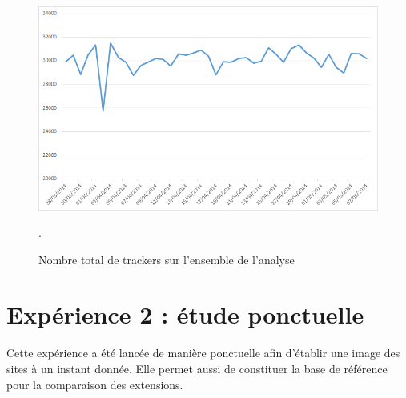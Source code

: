 \begin{figure}[h]
	\centering
	\includegraphics[scale=.8]{graphiques/Exp1_parser_total_trackers.png}
	\caption{\label{Exp1_parser_total_trackers}Nombre total de trackers sur l'ensemble de l'analyse}.
\end{figure}

\section{Expérience 2 : étude ponctuelle}
Cette expérience a été lancée de manière ponctuelle afin d'établir une image des sites à un instant donnée. Elle permet aussi de constituer la base de référence pour la comparaison des extensions.
\newline

